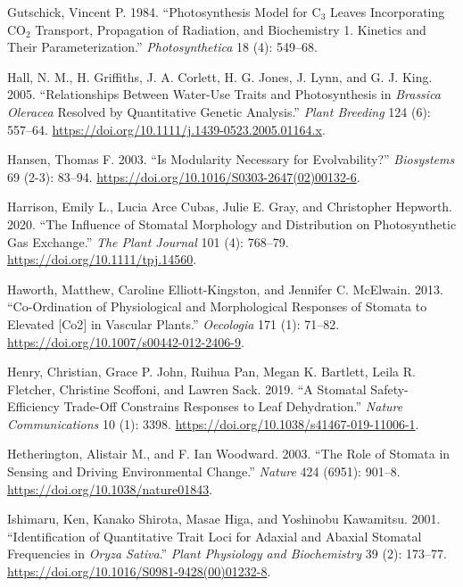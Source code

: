 \documentclass[
  12pt,
]{article}
\newlength{\cslhangindent}
\newlength{\cslentryspacingunit} %
\newenvironment{CSLReferences}[2] %
 {%
  \setlength{\parindent}{0pt}
  \ifodd #1
  \let\oldpar\par
  \def\par{\hangindent=\cslhangindent\oldpar}
  \fi
  \setlength{\parskip}{#2\cslentryspacingunit}
 }%
 {}
\begin{document}
\begin{CSLReferences}{1}{0}
\leavevmode{}%
Gutschick, Vincent P. 1984. {``Photosynthesis Model for {C}\(_{\textrm{3}}\) Leaves Incorporating {CO}\(_{\textrm{2}}\) Transport, Propagation of Radiation, and Biochemistry 1. Kinetics and Their Parameterization.''} \emph{Photosynthetica} 18 (4): 549--68.

\leavevmode{}%
Hall, N. M., H. Griffiths, J. A. Corlett, H. G. Jones, J. Lynn, and G. J. King. 2005. {``Relationships Between Water-Use Traits and Photosynthesis in \emph{{Brassica} Oleracea} Resolved by Quantitative Genetic Analysis.''} \emph{Plant Breeding} 124 (6): 557--64. \url{https://doi.org/10.1111/j.1439-0523.2005.01164.x}.

\leavevmode{}%
Hansen, Thomas F. 2003. {``Is Modularity Necessary for Evolvability?''} \emph{Biosystems} 69 (2-3): 83--94. \url{https://doi.org/10.1016/S0303-2647(02)00132-6}.

\leavevmode{}%
Harrison, Emily L., Lucia Arce Cubas, Julie E. Gray, and Christopher Hepworth. 2020. {``The Influence of Stomatal Morphology and Distribution on Photosynthetic Gas Exchange.''} \emph{The Plant Journal} 101 (4): 768--79. \url{https://doi.org/10.1111/tpj.14560}.

\leavevmode{}%
Haworth, Matthew, Caroline Elliott-Kingston, and Jennifer C. McElwain. 2013. {``Co-Ordination of Physiological and Morphological Responses of Stomata to Elevated {[}{Co2}{]} in Vascular Plants.''} \emph{Oecologia} 171 (1): 71--82. \url{https://doi.org/10.1007/s00442-012-2406-9}.

\leavevmode{}%
Henry, Christian, Grace P. John, Ruihua Pan, Megan K. Bartlett, Leila R. Fletcher, Christine Scoffoni, and Lawren Sack. 2019. {``A Stomatal Safety-Efficiency Trade-Off Constrains Responses to Leaf Dehydration.''} \emph{Nature Communications} 10 (1): 3398. \url{https://doi.org/10.1038/s41467-019-11006-1}.

\leavevmode{}%
Hetherington, Alistair M., and F. Ian Woodward. 2003. {``The Role of Stomata in Sensing and Driving Environmental Change.''} \emph{Nature} 424 (6951): 901--8. \url{https://doi.org/10.1038/nature01843}.

\leavevmode{}%
Ishimaru, Ken, Kanako Shirota, Masae Higa, and Yoshinobu Kawamitsu. 2001. {``Identification of Quantitative Trait Loci for Adaxial and Abaxial Stomatal Frequencies in \emph{{Oryza} Sativa}.''} \emph{Plant Physiology and Biochemistry} 39 (2): 173--77. \url{https://doi.org/10.1016/S0981-9428(00)01232-8}.


\end{CSLReferences}
\end{document}
